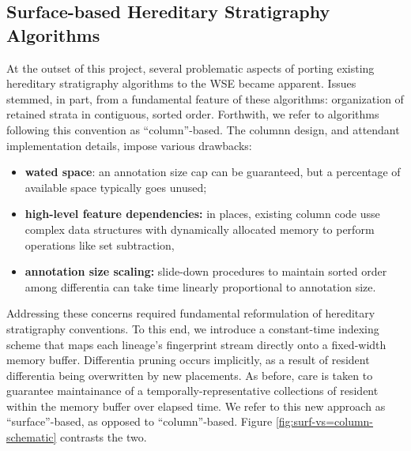 \subsection{Surface-based Hereditary Stratigraphy Algorithms}

At the outset of this project, several problematic aspects of porting existing hereditary stratigraphy algorithms to the WSE became apparent.
Issues stemmed, in part, from a fundamental feature of these algorithms: organization of retained strata in contiguous, sorted order.
Forthwith, we refer to algorithms following this convention as ``column''-based.
The columnn design, and attendant implementation details, impose various drawbacks:
\begin{itemize}
\item \textbf{wated space}: an annotation size cap can be guaranteed, but a percentage of available space typically goes unused;
\item \textbf{high-level feature dependencies:} in places, existing column code usse complex data structures with dynamically allocated memory to perform operations like set subtraction,
\item \textbf{annotation size scaling:} slide-down procedures to maintain sorted order among differentia can take time linearly proportional to annotation size.
\end{itemize}



Addressing these concerns required fundamental reformulation of hereditary stratigraphy conventions.
To this end, we introduce a constant-time indexing scheme that maps each lineage's fingerprint stream directly onto a fixed-width memory buffer.
Differentia pruning occurs implicitly, as a result of resident differentia being overwritten by new placements.
As before, care is taken to guarantee maintainance of a temporally-representative collections of resident within the memory buffer over elapsed time.
We refer to this new approach as ``surface''-based, as opposed to ``column''-based.
Figure \ref{fig:surf-vs=column-schematic} contrasts the two.




